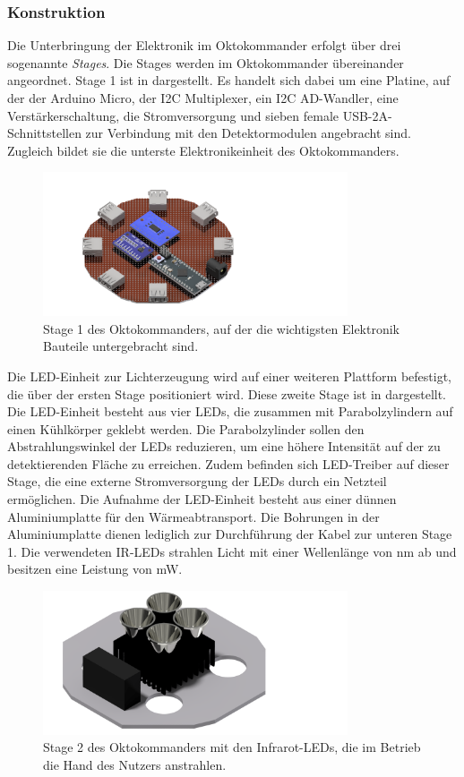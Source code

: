 \subsubsection*{Konstruktion}
Die Unterbringung der Elektronik im Oktokommander erfolgt über drei sogenannte \textit{Stages}. Die Stages werden im Oktokommander übereinander angeordnet. Stage 1 ist in  dargestellt. Es handelt sich dabei um eine Platine, auf der der Arduino Micro, der I2C Multiplexer, ein I2C AD-Wandler, eine Verstärkerschaltung, die Stromversorgung und sieben female USB-2A-Schnittstellen zur Verbindung mit den Detektormodulen angebracht sind. Zugleich bildet sie die unterste Elektronikeinheit des Oktokommanders.
\begin{figure}[H]
	\centering
	\includegraphics[width=9cm]{../CAD_Bilder/OktagonElektronik_Stage1_raytraced.png}
	\caption{Stage 1 des Oktokommanders, auf der die wichtigsten Elektronik Bauteile untergebracht sind.}
	\label{fig:OktoStage1}
\end{figure}
\noindent
Die LED-Einheit zur Lichterzeugung wird auf einer weiteren Plattform befestigt, die über der ersten Stage positioniert wird. Diese zweite Stage ist in  dargestellt. Die LED-Einheit besteht aus vier LEDs, die zusammen mit Parabolzylindern auf einen Kühlkörper geklebt werden. Die Parabolzylinder sollen den Abstrahlungswinkel der LEDs reduzieren, um eine höhere Intensität auf der zu detektierenden Fläche zu erreichen. Zudem befinden sich LED-Treiber auf dieser Stage, die eine externe Stromversorgung der LEDs durch ein Netzteil ermöglichen. Die Aufnahme der LED-Einheit besteht aus einer dünnen Aluminiumplatte für den Wärmeabtransport. Die Bohrungen in der Aluminiumplatte dienen lediglich zur Durchführung der Kabel zur unteren Stage 1. Die verwendeten IR-LEDs strahlen Licht mit einer Wellenlänge von \unit[945]{nm} ab und besitzen eine Leistung von \unit[300]{mW}. 
\begin{figure}[H]
	\centering
	\includegraphics[width=9cm]{../CAD_Bilder/OktagonElektronik_Stage2_raytraced.png}
	\caption{Stage 2 des Oktokommanders mit den Infrarot-LEDs, die im Betrieb die Hand des Nutzers anstrahlen.}
	\label{fig:OktoStage2}
\end{figure}
